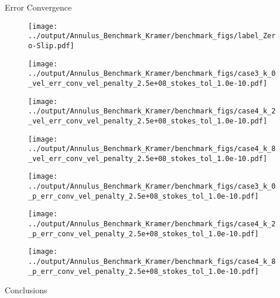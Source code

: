 \documentclass[10pt,aspectratio=169]{beamer}
\begin{document}
\begin{frame}[fragile]{Error Convergence}
	\begin{figure}
		
		\texttt{[image: ../output/Annulus\_Benchmark\_Kramer/benchmark\_figs/label\_Zero-Slip.pdf]}
		\vspace{-0.15in}
		\begin{multicols}{3}
			\texttt{[image: ../output/Annulus\_Benchmark\_Kramer/benchmark\_figs/case3\_k\_0\_vel\_err\_conv\_vel\_penalty\_2.5e+08\_stokes\_tol\_1.0e-10.pdf]}\par
			\hspace{-0.08in}
			\texttt{[image: ../output/Annulus\_Benchmark\_Kramer/benchmark\_figs/case4\_k\_2\_vel\_err\_conv\_vel\_penalty\_2.5e+08\_stokes\_tol\_1.0e-10.pdf]}\par
			\hspace{-0.12in}
			\texttt{[image: ../output/Annulus\_Benchmark\_Kramer/benchmark\_figs/case4\_k\_8\_vel\_err\_conv\_vel\_penalty\_2.5e+08\_stokes\_tol\_1.0e-10.pdf]}
		\end{multicols}
		
		\vspace{-0.3in}
		
		\begin{multicols}{3}
			\texttt{[image: ../output/Annulus\_Benchmark\_Kramer/benchmark\_figs/case3\_k\_0\_p\_err\_conv\_vel\_penalty\_2.5e+08\_stokes\_tol\_1.0e-10.pdf]}\par
			\hspace{-0.08in} 
			\texttt{[image: ../output/Annulus\_Benchmark\_Kramer/benchmark\_figs/case4\_k\_2\_p\_err\_conv\_vel\_penalty\_2.5e+08\_stokes\_tol\_1.0e-10.pdf]}\par
			\hspace{-0.12in}
			\texttt{[image: ../output/Annulus\_Benchmark\_Kramer/benchmark\_figs/case4\_k\_8\_p\_err\_conv\_vel\_penalty\_2.5e+08\_stokes\_tol\_1.0e-10.pdf]}
		\end{multicols}
	\end{figure}
\end{frame}

\begin{frame}[fragile]{Conclusions}
\end{frame}
\end{document}
